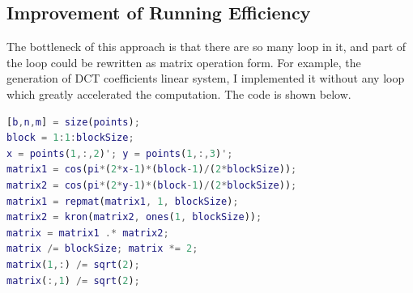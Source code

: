 \documentclass{article}
\begin{document}
\subsection{Improvement of Running Efficiency}
The bottleneck of this approach is that there are so many loop in it, and part of the loop could be rewritten as matrix operation form. For example, the generation of DCT coefficients linear system, I implemented it without any loop which greatly accelerated the computation. The code is shown below.
\begin{lstlisting}[language=matlab]
[b,n,m] = size(points);
block = 1:1:blockSize;
x = points(1,:,2)'; y = points(1,:,3)';
matrix1 = cos(pi*(2*x-1)*(block-1)/(2*blockSize));
matrix2 = cos(pi*(2*y-1)*(block-1)/(2*blockSize));
matrix1 = repmat(matrix1, 1, blockSize);
matrix2 = kron(matrix2, ones(1, blockSize));
matrix = matrix1 .* matrix2;
matrix /= blockSize; matrix *= 2;
matrix(1,:) /= sqrt(2);
matrix(:,1) /= sqrt(2);
\end{lstlisting}
\end{document}
